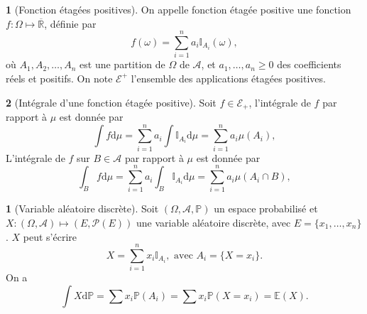 \documentclass[8pt,notheorems]{beamer}
\def \E{\mathbb E}
\def \R{\mathbb{R}}
\def \Om{\Omega}
\def \om{\omega}
\theoremstyle{definition}
\newtheorem{definition}{\translate{Definition}}
\theoremstyle{example}
\newtheorem{example}{\translate{Exemple}}
\theoremstyle{mystyle}
\theoremstyle{plain}
\begin{document}
\begin{frame}[allowframebreaks]
\begin{definition}[Fonction étagées positives]
  On appelle fonction étagée positive une fonction $f:\Om\mapsto \overline{\R}$, définie par
  $$
    f(\om)=\sum_{i=1}^{n}a_i\mathbb{I}_{A_i}(\om),
  $$
  où $A_1,A_2,\ldots,A_n$ est une partition de $\Omega$ de $\mathcal{A}$, et $a_1,\ldots,a_n\geq 0$ des coefficients réels et positifs. On note $\mathcal{E}^+$ l'ensemble des applications étagées positives. 
\end{definition}

\begin{definition}[Intégrale d'une fonction étagée positive]
Soit $f\in\mathcal{E}_+$, l'intégrale de $f$ par rapport à $\mu$ est donnée par
$$
\int f\text{d}\mu=\sum_{i=1}^{n}a_i\int \mathbb{I}_{A_i}\text{d}\mu=\sum_{i=1}^{n}a_i\mu(A_i),
$$
L'intégrale de $f$ sur $B\in\mathcal{A}$ par rapport à $\mu$ est donnée par
$$
\int_{B}f\text{d}\mu=\sum_{i=1}^{n}a_i\int_B\mathbb{I}_{A_i}\text{d}\mu=\sum_{i=1}^{n}a_i\mu(A_i\cap B),
$$
\end{definition}
\begin{example}[Variable aléatoire discrète]
Soit $(\Omega, \mathcal{A}, \mathbb{P})$ un espace probabilisé et $X:(\Omega, \mathcal{A})\mapsto (E, \mathcal{P}(E))$ une variable aléatoire discrète, avec $E = \{x_1,\ldots, x_n\}$. $X$ peut s'écrire 
$$
X = \sum_{i = 1}^n x_i\mathbb{I}_{A_i}, \text{ avec }A_i = \{X = x_i\}.
$$ 
On a 
$$
\int X\text{d}\mathbb{P} = \sum x_i\mathbb{P}(A_i) = \sum x_i\mathbb{P}(X = x_i) = \E(X).
$$
\end{example}
\end{frame}
\end{document}
